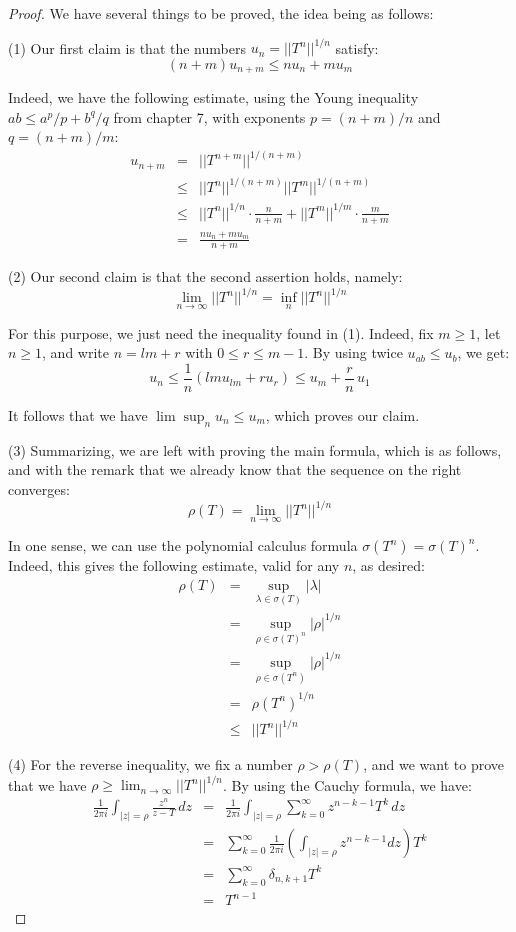 \documentclass[12pt]{amsbook}
\begin{document}
\begin{proof}
We have several things to be proved, the idea being as follows:

\medskip

(1) Our first claim is that the numbers $u_n=||T^n||^{1/n}$ satisfy:
$$(n+m)u_{n+m}\leq nu_n+mu_m$$

Indeed, we have the following estimate, using the Young inequality $ab\leq a^p/p+b^q/q$ from chapter 7, with exponents $p=(n+m)/n$ and $q=(n+m)/m$:
\begin{eqnarray*}
u_{n+m}
&=&||T^{n+m}||^{1/(n+m)}\\
&\leq&||T^n||^{1/(n+m)}||T^m||^{1/(n+m)}\\
&\leq&||T^n||^{1/n}\cdot\frac{n}{n+m}+||T^m||^{1/m}\cdot\frac{m}{n+m}\\
&=&\frac{nu_n+mu_m}{n+m}
\end{eqnarray*}

(2) Our second claim is that the second assertion holds, namely:
$$\lim_{n\to\infty}||T^n||^{1/n}=\inf_n||T^n||^{1/n}$$

For this purpose, we just need the inequality found in (1). Indeed, fix $m\geq1$, let $n\geq1$, and write $n=lm+r$ with $0\leq r\leq m-1$. By using twice $u_{ab}\leq u_b$, we get:
$$u_n
\leq\frac{1}{n}( lmu_{lm}+ru_r)
\leq u_{m}+\frac{r}{n}\,u_1$$

It follows that we have $\lim\sup_nu_n\leq u_m$, which proves our claim.

\medskip

(3) Summarizing, we are left with proving the main formula, which is as follows, and with the remark that we already know that the sequence on the right converges:
$$\rho(T)=\lim_{n\to\infty}||T^n||^{1/n}$$

In one sense, we can use the polynomial calculus formula $\sigma(T^n)=\sigma(T)^n$. Indeed, this gives the following estimate, valid for any $n$, as desired:
\begin{eqnarray*}
\rho(T)
&=&\sup_{\lambda\in\sigma(T)}|\lambda|\\
&=&\sup_{\rho\in\sigma(T)^n}|\rho|^{1/n}\\
&=&\sup_{\rho\in\sigma(T^n)}|\rho|^{1/n}\\
&=&\rho(T^n)^{1/n}\\
&\leq&||T^n||^{1/n}
\end{eqnarray*}

(4) For the reverse inequality, we fix a number $\rho>\rho(T)$, and we want to prove that we have $\rho\geq\lim_{n\to\infty}||T^n||^{1/n}$. By using the Cauchy formula, we have:
\begin{eqnarray*}
\frac{1}{2\pi i}\int_{|z|=\rho}\frac{z^n}{z-T}\,dz
&=&\frac{1}{2\pi i}\int_{|z|=\rho}\sum_{k=0}^\infty z^{n-k-1}T^k\,dz\\
&=&\sum_{k=0}^\infty\frac{1}{2\pi i}\left(\int_{|z|=\rho}z^{n-k-1}dz\right)T^k\\
&=&\sum_{k=0}^\infty\delta_{n,k+1}T^k\\
&=&T^{n-1}
\end{eqnarray*}


\end{proof}
\end{document}
